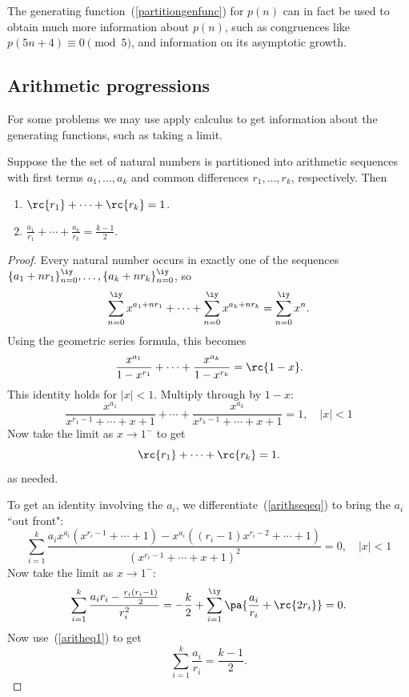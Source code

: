 The generating function~(\ref{partitiongenfunc}) for $p(n)$ can in fact be used to obtain much more information about $p(n)$, such as congruences like $p(5n+4)\equiv 0\pmod 5$, and information on its asymptotic growth.
\subsection{Arithmetic progressions}\label{arith}
For some problems we may use apply calculus to get information about the generating functions, such as taking a limit.
\begin{ex}
Suppose the the set of natural numbers is partitioned into arithmetic sequences with first terms $a_1,\ldots, a_k$ and common differences $r_1,\ldots, r_k$, respectively. Then
\begin{enumerate}
\item
$\rc{r_1}+\cdots+\rc{r_k}=1$.
\item
$\frac{a_1}{r_1}+\cdots +\frac{a_k}{r_k}=\frac{k-1}{2}$.
\end{enumerate}
\end{ex}
\begin{proof}
Every natural number occurs in exactly one of the sequences $\{a_1+nr_1\}_{n=0}^{\iy}, \ldots, \{a_k+nr_k\}_{n=0}^{\iy}$, so
\[
\sum_{n=0}^{\iy} x^{a_1+nr_1}+\cdots +\sum_{n=0}^{\iy} x^{a_k+nr_k}=\sum_{n=0}^{\iy} x^n.
\]
Using the geometric series formula, this becomes
\[
\frac{x^{a_1}}{1-x^{r_1}}+\cdots +\frac{x^{a_k}}{1-x^{r_k}}=\rc{1-x}.
\]
This identity holds for $|x|<1$. Multiply through by $1-x$:
\begin{equation}\label{arithseqeq}
\frac{x^{a_1}}{x^{r_1-1}+\cdots +x+1}+\cdots +
\frac{x^{a_k}}{x^{r_k-1}+\cdots +x+1}=1,\quad |x|<1
\end{equation}
Now take the limit as $x\to 1^-$ to get
\begin{equation}\label{aritheq1}
\rc{r_1}+\cdots+\rc{r_k}=1.
\end{equation}
as needed.

To get an identity involving the $a_i$, we differentiate~(\ref{arithseqeq}) to bring the $a_i$ ``out front":
\[
\sum_{i=1}^k \frac{a_ix^{a_i}(x^{r_i-1}+\cdots +1)-x^{a_i}((r_i-1)x^{r_i-2}+\cdots +1)}{(x^{r_i-1}+\cdots +x+1)^2}=0,\quad |x|<1
\]
Now take the limit as $x\to 1^-$:
\[
\sum_{i=1}^k \frac{a_ir_i-\frac{r_i(r_i-1)}{2}}{r_i^2}=-\frac k2+\sum_{i=1}^{\iy} \pa{\frac{a_i}{r_i}+\rc{2r_i}}=0.
\]
Now use~(\ref{aritheq1}) to get
\[
\sum_{i=1}^k \frac{a_i}{r_i}=\frac{k-1}{2}.
\]
\end{proof}
